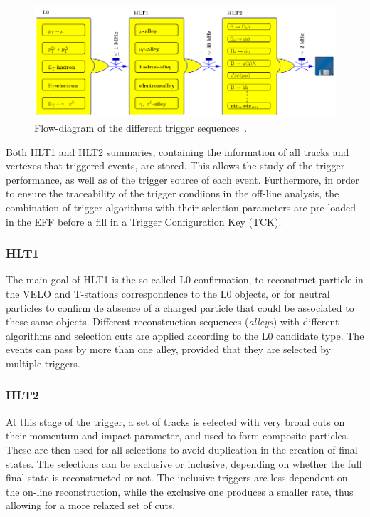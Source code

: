\begin{figure} [htb!]
\begin{center}
\includegraphics[scale=0.7]{figs/HLT.png}
\caption{Flow-diagram of the different trigger sequences~\cite{Alves:2008zz}.\label{fig:lhcb_HLT}}
\end{center}
\end{figure}

Both HLT1 and HLT2 summaries, containing the information of all tracks and vertexes that triggered events, are stored. This allows the study of the trigger performance, as well as of the trigger source of each event. Furthermore, in order to ensure the traceability of the trigger condiions in the off-line analysis, the combination of trigger algorithms with their selection parameters are pre-loaded in the EFF before a fill in a Trigger Configuration Key (TCK). 

\subsubsection{HLT1} 
\label{sec:HLT1}
The main goal of HLT1 is the so-called L0 confirmation, to reconstruct particle in the VELO and T-stations correspondence to the L0 objects, or for neutral particles to confirm de absence of a charged particle that could be associated to these same objects. Different reconstruction sequences (\textit{alleys}) with different algorithms and selection cuts are applied according to the L0 candidate type. The events can pass by more than one alley, provided that they are selected by multiple triggers. 
\subsubsection{HLT2}
At this stage of the trigger, a set of tracks is selected with very broad cuts on their momentum and impact parameter, and used to form composite particles. These are then used for all selections to avoid duplication in the creation of final states. The selections can be exclusive or inclusive, depending on whether the full final state is reconstructed or not. The inclusive triggers are less dependent on the on-line reconstruction, while the exclusive one produces a smaller rate, thus allowing for a more relaxed set of cuts.  
\label{sec:HLT2}

